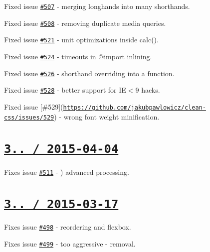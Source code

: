 \begin{DoxyItemize}
\item Fixed issue \href{https://github.com/jakubpawlowicz/clean-css/issues/507}{\tt \#507} -\/ merging longhands into many shorthands.
\item Fixed issue \href{https://github.com/jakubpawlowicz/clean-css/issues/508}{\tt \#508} -\/ removing duplicate media queries.
\item Fixed issue \href{https://github.com/jakubpawlowicz/clean-css/issues/521}{\tt \#521} -\/ unit optimizations inside {\ttfamily calc()}.
\item Fixed issue \href{https://github.com/jakubpawlowicz/clean-css/issues/524}{\tt \#524} -\/ timeouts in {\ttfamily @import} inlining.
\item Fixed issue \href{https://github.com/jakubpawlowicz/clean-css/issues/526}{\tt \#526} -\/ shorthand overriding into a function.
\item Fixed issue \href{https://github.com/jakubpawlowicz/clean-css/issues/528}{\tt \#528} -\/ better support for IE$<$9 hacks.
\item Fixed issue \mbox{[}\#529\mbox{]}(\href{https://github.com/jakubpawlowicz/clean-css/issues/529}{\tt https\+://github.\+com/jakubpawlowicz/clean-\/css/issues/529}) -\/ wrong font weight minification.
\end{DoxyItemize}

\section*{\href{https://github.com/jakubpawlowicz/clean-css/compare/v3.1.8...v3.1.9}{\tt 3.. / 2015-\/04-\/04} }


\begin{DoxyItemize}
\item Fixes issue \href{https://github.com/jakubpawlowicz/clean-css/issues/511}{\tt \#511} -\/ {\ttfamily )} advanced processing.
\end{DoxyItemize}

\section*{\href{https://github.com/jakubpawlowicz/clean-css/compare/v3.1.7...v3.1.8}{\tt 3.. / 2015-\/03-\/17} }


\begin{DoxyItemize}
\item Fixes issue \href{https://github.com/jakubpawlowicz/clean-css/issues/498}{\tt \#498} -\/ reordering and flexbox.
\item Fixes issue \href{https://github.com/jakubpawlowicz/clean-css/issues/499}{\tt \#499} -\/ too aggressive {\ttfamily -\/} removal.
\end{DoxyItemize}

